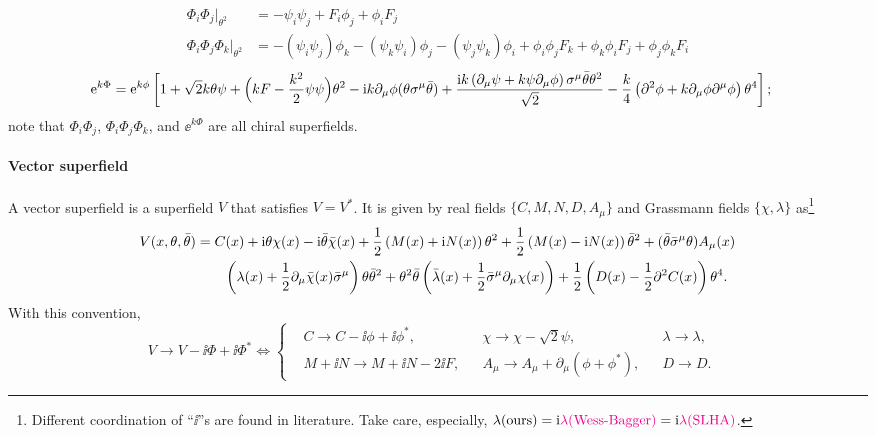 \documentclass[CheatSheet]{subfiles}
\begin{document}
\begin{align}
 \Phi_i\Phi_j\Big|_{\theta^2}&=-\psi_i\psi_j+F_i\phi_j+\phi_iF_j
\\
\Phi_i\Phi_j\Phi_k\Big|_{\theta^2}&=
-(\psi_i\psi_j)\phi_k-(\psi_k\psi_i)\phi_j-(\psi_j\psi_k)\phi_i+\phi_i\phi_jF_k+\phi_k\phi_iF_j+\phi_j\phi_kF_i
\end{align}
\begin{equation}
 \begin{split}
\mathop{}\!\mathrm{e}^{k\Phi} &=
\mathop{}\!\mathrm{e}^{k\phi}\left[1+\sqrt{2} k \theta \psi+\Bigl(kF-\frac{k^2}{2}\psi\psi\Bigr) \theta^2-\mathrm{i} k \partial_{\mu}\phi (\theta \sigma^{\mu}\bar\theta)
+\frac{\mathrm{i} k \left(\partial_{\mu}\psi+k\psi\partial_{\mu}\phi\right)\sigma^{\mu}\bar\theta \theta^2}{\sqrt{2}}-\frac{k}{4} \left(\partial^2\phi+k \partial_{\mu}\phi\partial^{\mu}\phi\right) \theta^4\right];
\end{split}
\end{equation}
note that $\Phi_i\Phi_j$, $\Phi_i\Phi_j\Phi_k$, and $\ee^{k\Phi}$ are all chiral superfields.

\paragraph{Vector superfield}
A vector superfield is a superfield $V$ that satisfies $V=V^*$.
It is given by real fields $\{C, M, N, D, A_\mu\}$ and Grassmann fields $\{\chi, \lambda\}$ as\footnote{Different coordination of ``$\ii$''s are found in literature. Take care, especially, $\lambda(\text{ours})=\mathrm{i}{\color{magenta}\lambda(\text{Wess-Bagger})}=\mathrm{i}{\color{magenta}\lambda(\text{SLHA})}$.}
\begin{equation}
\begin{split}
  V(x,\theta,\bar\theta)
&=
C(x)+\mathrm{i}\theta \chi(x)-\mathrm{i}\bar\theta\bar{\chi}(x)+\frac{1}{2} \left(M(x)+\mathrm{i} N(x)\right) \theta^2
+\frac{1}{2} \left(M(x)-\mathrm{i} N(x)\right) \bar\theta^2
+(\bar\theta\bar\sigma^{\mu}\theta)A_{\mu}(x)
\\&\qquad
\left(\lambda(x)+\frac12\partial_{\mu}\bar{\chi}(x)\bar\sigma^{\mu}\right)\theta\bar\theta^2
+\theta^2\bar\theta\left(\bar{\lambda}(x)+\frac12\bar\sigma^{\mu}\partial_{\mu}\chi(x)\right)
+\frac{1}{2} \left(D(x)-\frac12\partial^2C(x)\right) \theta^4.
\end{split}
\end{equation}
With this convention,
\begin{equation}
V\to V-\ii\Phi+\ii\Phi^*\Longleftrightarrow\left\{
\begin{split}
   &C\to C-\ii\phi+\ii\phi^*,&
 &\chi\to \chi-\sqrt2\psi,&
 &\lambda\to\lambda,&
\\
 &M+\ii N\to M+\ii N - 2\ii F,&
 &A_\mu\to A_\mu+\partial_\mu(\phi+\phi^*),&
 &D\to D.
\end{split}\right.
\end{equation}
\end{document}
